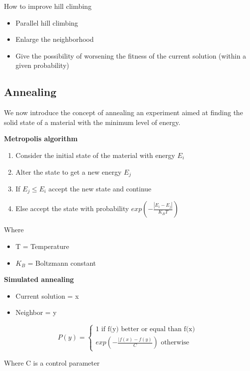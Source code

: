 How to improve hill climbing

\begin{itemize}
    \item Parallel hill climbing
    \item Enlarge the neighborhood
    \item Give the possibility of worsening the fitness of the current solution (within a given probability)
\end{itemize}


\subsection{Annealing}

We now introduce the concept of annealing \ra an experiment aimed at finding the solid state of a material with the minimum level of energy.

\textbf{Metropolis algorithm}

\begin{enumerate}
    \item Consider the initial state of the material with energy $E_i$
    \item Alter the state to get a new energy $E_j$
    \item If $E_j \le E_i$ accept the new state and continue
    \item Else accept the state with probability $exp(-\frac{|E_i - E_j|}{K_B T})$
\end{enumerate}

Where 
\begin{itemize}
    \item T = Temperature
    \item $K_B$ = Boltzmann constant
\end{itemize}

\textbf{Simulated annealing}

\begin{itemize}
    \item Current solution = x
    \item Neighbor = y
\end{itemize}

\[
P(y) = \begin{cases}
    1 \text{ if f(y) better or equal than f(x)} \\
    exp(-\frac{|f(x) - f(y)}{C}) \text{ otherwise}
\end{cases}
\]

Where C is a control parameter

